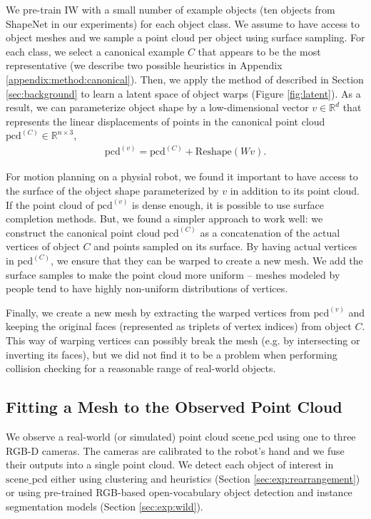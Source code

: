 \documentclass{article}
\newcommand{\pcx}[1]{\mathrm{pcd}^{(#1)}}
\newcommand{\pcc}{\pcx{C}}
\begin{document}
We pre-train IW with a small number of example objects (ten objects from ShapeNet \cite{chang15shapenet} in our experiments) for each object class. We assume to have access to object meshes and we sample a point cloud per object using surface sampling. For each class, we select a canonical example $C$ that appears to be the most representative (we describe two possible heuristics in Appendix \ref{appendix:method:canonical}). Then, we apply the method of \cite{rodriguez18transferring} described in Section \ref{sec:background} to learn a latent space of object warps (Figure \ref{fig:latent}). As a result, we can parameterize object shape by a low-dimensional vector $v \in \mathbb{R}^d$ that represents the linear displacements of points in the canonical point cloud $\pcc \in \mathbb{R}^{n \times 3}$,
\begin{align}
    \pcx{v} = \pcc + \mathrm{Reshape}(W v). \label{eq:warp}
\end{align}

For motion planning on a physial robot, we found it important to have access to the surface of the object shape parameterized by $v$ in addition to its point cloud. If the point cloud of $\pcx{v}$ is dense enough, it is possible to use surface completion methods. But, we found a simpler approach to work well: we construct the canonical point cloud $\pcc$ as a concatenation of the actual vertices of object $C$ and points sampled on its surface. By having actual vertices in $\pcc$, we ensure that they can be warped to create a new mesh. We add the surface samples to make the point cloud more uniform -- meshes modeled by people tend to have highly non-uniform distributions of vertices.

Finally, we create a new mesh by extracting the warped vertices from $\pcx{v}$ and keeping the original faces (represented as triplets of vertex indices) from object $C$. This way of warping vertices can possibly break the mesh (e.g. by intersecting or inverting its faces), but we did not find it to be a problem when performing collision checking for a reasonable range of real-world objects.

\subsection{Fitting a Mesh to the Observed Point Cloud}
\label{sec:methods:scene}

We observe a real-world (or simulated) point cloud $\mathrm{scene\_pcd}$ using one to three RGB-D cameras. The cameras are calibrated to the robot's hand and we fuse their outputs into a single point cloud. We detect each object of interest in $\mathrm{scene\_pcd}$ either using clustering and heuristics (Section \ref{sec:exp:rearrangement}) or using pre-trained RGB-based open-vocabulary object detection and instance segmentation models (Section \ref{sec:exp:wild}).
\end{document}
